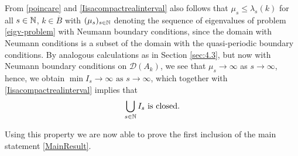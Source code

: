From \eqref{poincare} and \eqref{Iisacompactrealinterval} also follows that $\mu_{s} \leq \lambda_{s}(k)$ for all $s \in \mathbb{N}$, $k \in \overline{B}$ with $(\mu_{s})_{s \in \mathbb{N}}$ denoting the sequence of eigenvalues of problem \eqref{eigv-problem} with Neumann boundary conditions, since the domain with Neumann conditions is a subset of the domain with the quasi-periodic boundary conditions. By analogous calculations as in Section \ref{sec:4.3}, but now with Neumann boundary conditions on $\mathcal{D}(A_{k})$, we see that $\mu_{s} \rightarrow \infty$ as $s \rightarrow \infty$, hence, we obtain $\min I_{s} \rightarrow \infty \text{ as } s \rightarrow \infty$, which together with \eqref{Iisacompactrealinterval} implies that
	\begin{equation}
		\bigcup_{s \in \mathbb{N}} I_{s} \text{ is closed.} \label{UIclosed}
	\end{equation}

Using this property we are now able to prove the first inclusion of the main statement \eqref{MainResult}.	

